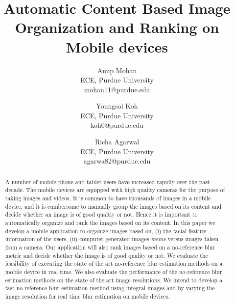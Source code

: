\documentclass[a4paper,10pt]{article}
\title{\textbf{Automatic Content Based Image Organization and Ranking on Mobile devices}}
\author{Anup Mohan\\
ECE, Purdue University\\
mohan11@purdue.edu\\
\and
Youngsol Koh\\
ECE, Purdue University\\
koh0@purdue.edu\\
\and
Richa Agarwal\\
ECE, Purdue University\\
agarwa82@purdue.edu\\
}
\begin{document}
\maketitle



\begin{abstract}
A number of mobile phone and tablet users have increased rapidly over the past decade. The mobile devices are equipped with 
high quality cameras for the purpose of taking images and videos. It is common to have thousands of images in a mobile device,
and it is cumbersome to manually group the images based on its content and decide whether an image is of good qualtiy or not.
Hence it is important to automatically organize and rank the images based on its content. In this paper we develop a mobile 
application to organize images based on, (i) the facial feature information of the users, (ii) computer generated images \textit{meme} versus images 
taken from a camera. Our application will also rank images based on a no-reference blur metric and decide whether the image is 
of good quality or not. We evaluate the feasibility of executing the state of the art no-reference blur estimation methods on a 
mobile device in real time. We also evaluate the performance of the no-reference blur estimation methods on the state of the 
art image resolutions. We intend to develop a fast no-reference blur estimation method using integral images and by varying the
image resolution for real time blur estimation on mobile devices.
\end{abstract}
\end{document}
